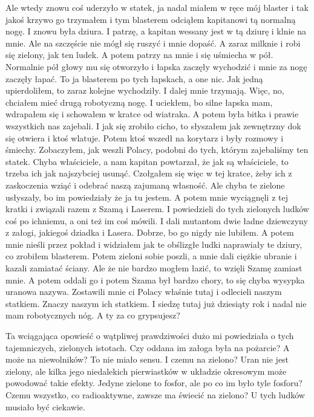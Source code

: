 \begin{poem}
	Ale wtedy znowu coś uderzyło w statek, ja nadal miałem w ręce mój blaster i tak jakoś krzywo go trzymałem i tym blasterem odciąłem kapitanowi tą normalną nogę. I znowu była dziura.
	I patrzę, a kapitan wessany jest w tą dziurę i klnie na mnie. Ale na szczęście nie mógł się ruszyć i mnie dopaść.
	A zaraz milknie i robi się zielony, jak ten ludek.
	A potem patrzy na mnie i się uśmiecha w pół. Normalnie pół głowy mu się otworzyło i łapska zaczęły wychodzić i mnie za nogę zaczęły łapać. 
	To ja blasterem po tych łapskach, a one nic. Jak jedną upierdoliłem, to zaraz kolejne wychodziły. I dalej mnie trzymają.
	Więc, no, chciałem mieć drugą robotyczną nogę.
	I uciekłem, bo silne łapska mam, wdrapałem się i schowałem w kratce od wiatraka.
	A potem była bitka i prawie wszystkich nas zajebali.
	I jak się zrobiło cicho, to słyszałem jak zewnętrzny dok się otwiera i ktoś wlatuje.
	Potem ktoś wszedł na korytarz i były rozmowy i śmiechy.
	Zobaczyłem, jak weszli Polacy, podobni do tych, którym zajebaliśmy ten statek. Chyba właściciele, a nam kapitan powtarzał, że jak są właściciele, to trzeba ich jak najszybciej usunąć.
	Czołgałem się więc w tej kratce, żeby ich z zaskoczenia wziąć i odebrać naszą zajumaną własność.
	Ale chyba te zielone usłyszały, bo im powiedziały że ja tu jestem.
	A potem mnie wyciągnęli z tej kratki i związali razem z Szamą i Laserem.
	I powiedzieli do tych zielonych ludków coś po ichniemu, a oni też im coś mówili. I dali mutantom dwie ładne dziewczyny z załogi, jakiegoś dziadka i Lasera.
	Dobrze, bo go nigdy nie lubiłem.
	A potem mnie nieśli przez pokład i widziałem jak te obślizgłe ludki naprawiały te dziury, co zrobiłem blasterem.
	Potem zieloni sobie poszli, a mnie dali ciężkie ubranie i kazali zamiatać ściany. Ale że nie bardzo mogłem łazić, to wzięli Szamę zamiast mnie.
	A potem oddali go i potem Szama był bardzo chory, to się chyba wysypka uranowa nazywa.
	Zostawili mnie ci Polacy właśnie tutaj i odlecieli naszym statkiem. Znaczy naszym ich statkiem.
	I siedzę tutaj już dziesiąty rok i nadal nie mam robotycznych nóg. A ty za co grypsujesz?
\end{poem}

Ta wciągająca opowieść o wątpliwej prawdziwości dużo mi powiedziała o tych tajemniczych, zielonych istotach.
Czy oddana im załoga była na pożarcie? A może na niewolników? To nie miało sensu.
I czemu na zielono? Uran nie jest zielony, ale kilka jego niedalekich pierwiastków w układzie okresowym może powodować takie efekty.
Jedyne zielone to fosfor, ale po co im było tyle fosforu? Czemu wszystko, co radioaktywne, zawsze ma świecić na zielono?
U tych ludków musiało być ciekawie.

